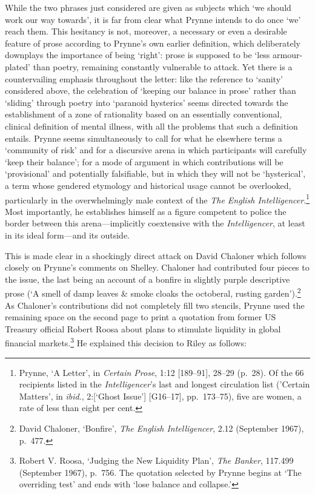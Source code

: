 \documentclass[]{article}
\begin{document}
While the two phrases just considered are given as subjects which `we
should work our way towards', it is far from clear what Prynne intends
to do once `we' reach them. This hesitancy is not, moreover, a necessary
or even a desirable feature of prose according to Prynne's own earlier
definition, which deliberately downplays the importance of being
`right': prose is supposed to be `less armour-plated' than poetry,
remaining constantly vulnerable to attack. Yet there is a countervailing
emphasis throughout the letter: like the reference to `sanity'
considered above, the celebration of `keeping our balance in prose'
rather than `sliding' through poetry into `paranoid hysterics' seems
directed towards the establishment of a zone of rationality based on an
essentially conventional, clinical definition of mental illness, with
all the problems that such a definition entails. Prynne seems
simultaneously to call for what he elsewhere terms a `community of risk'
and for a discursive arena in which participants will carefully `keep
their balance'; for a mode of argument in which contributions will be
`provisional' and potentially falsifiable, but in which they will not be
`hysterical', a term whose gendered etymology and historical usage
cannot be overlooked, particularly in the overwhelmingly male context of
the \emph{The English Intelligencer}.\footnote{Prynne, `A Letter', in
  \emph{Certain Prose}, 1:12 {[}189--91{]}, 28--29 (p.~28). Of the 66
  recipients listed in the \emph{Intelligencer}'s last and longest
  circulation list ('Certain Matters', in \emph{ibid}., 2:{[}`Ghost
  Issue'{]} {[}G16--17{]}, pp.~173--75), five are women, a rate of less
  than eight per cent.} Most importantly, he establishes himself as a
figure competent to police the border between this arena---implicitly
coextensive with the \emph{Intelligencer}, at least in its ideal
form---and its outside.

This is made clear in a shockingly direct attack on David Chaloner which
follows closely on Prynne's comments on Shelley. Chaloner had
contributed four pieces to the issue, the last being an account of a
bonfire in slightly purple descriptive prose (`A smell of damp leaves \&
smoke cloaks the octoberal, rusting garden').\footnote{David Chaloner,
  `Bonfire', \emph{The English Intelligencer}, 2.12 (September 1967),
  p.~477.} As Chaloner's contributions did not completely fill two
stencils, Prynne used the remaining space on the second page to print a
quotation from former US Treasury official Robert Roosa about plans to
stimulate liquidity in global financial markets.\footnote{Robert V.
  Roosa, `Judging the New Liquidity Plan', \emph{The Banker}, 117.499
  (September 1967), p.~756. The quotation selected by Prynne begins at
  `The overriding test' and ends with `lose balance and collapse.'} He
explained this decision to Riley as follows:
\end{document}
